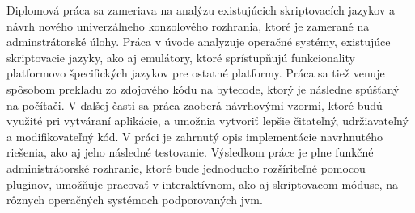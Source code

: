 Diplomová práca sa zameriava na analýzu existujúcich skriptovacích jazykov a návrh nového univerzálneho konzolového rozhrania, ktoré je  zamerané na adminstrátorské úlohy. Práca v úvode analyzuje operačné systémy, existujúce skriptovacie jazyky, ako aj emulátory, ktoré sprístupňujú funkcionality platformovo špecifických jazykov pre ostatné platformy. Práca sa  tiež venuje spôsobom prekladu zo zdojového kódu na bytecode, ktorý je následne spúšťaný na počítači. V ďalšej časti sa práca zaoberá návrhovými vzormi, ktoré budú využité pri vytváraní aplikácie, a umožnia vytvoriť lepšie čitateľný, udržiavateľný a modifikovateľný kód. V práci je zahrnutý opis implementácie navrhnutého riešenia, ako aj jeho následné testovanie. Výsledkom práce je plne funkčné administrátorské rozhranie, ktoré bude jednoducho rozšíriteľné pomocou pluginov, umožňuje pracovať v interaktívnom, ako aj skriptovacom móduse, na rôznych operačných systémoch podporovaných \acrshort{jvm}. 

